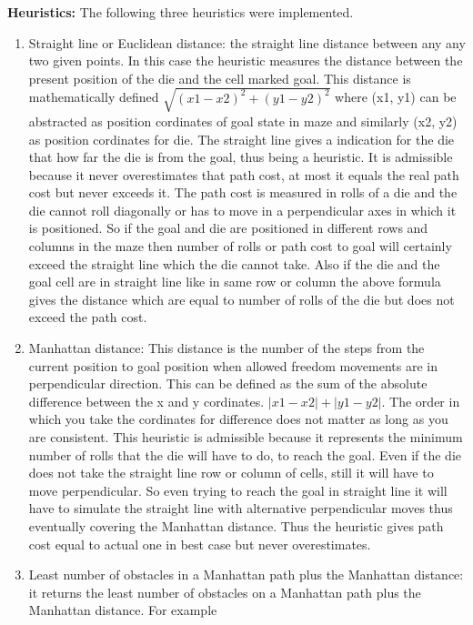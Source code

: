 \documentclass[12pt]{article}
\begin{document}
{\bf Heuristics:} The following three heuristics were implemented.
\begin{enumerate}
	\item Straight line or Euclidean distance: the straight line distance between any any two given points. In this case the heuristic measures the distance between the present position of the die and the cell marked goal. This distance is mathematically defined $\sqrt{ (x1 - x2)^2 + (y1 - y2)^2 }$ where (x1, y1) can be abstracted as position cordinates of goal state in maze and similarly (x2, y2) as position cordinates for die.
	The straight line gives a indication for the die that how far the die is from the goal, thus being a heuristic. It is admissible because it never overestimates that path cost, at most it equals the real path cost but never exceeds it. The path cost is measured in rolls of a die and the die cannot roll diagonally or has to move in a perpendicular axes in which it is positioned. So if the goal and die are positioned in different rows and columns in the maze then number of rolls or path cost to goal will certainly exceed the straight line which the die cannot take. Also if the die and the goal cell are in straight line like in same row or column the above formula gives the distance which are equal to number of rolls of the die but does not exceed the path cost.
	\item Manhattan distance: This distance is the number of the steps from the current position to goal position when allowed freedom movements are in perpendicular direction. This can be defined as the sum of the absolute difference between the x and y cordinates. $|x1 - x2| + |y1 - y2|$. The order in which you take the cordinates for difference does not matter as long as you are consistent.
	This heuristic is admissible because it represents the minimum number of rolls that the die will have to do, to reach the goal. Even if the die does not take the straight line row or column of cells, still it will have to move perpendicular. So even trying to reach the goal in straight line it will have to simulate the straight line with alternative perpendicular moves thus eventually covering the Manhattan distance. Thus the heuristic gives path cost equal to actual one in best case but never overestimates. 
	\item Least number of obstacles in a Manhattan path plus the Manhattan distance: it returns the least number of obstacles on a Manhattan path plus the Manhattan distance. For example \begin{tabular}{c c c c}

\end{tabular}
\end{enumerate}
\end{document}
